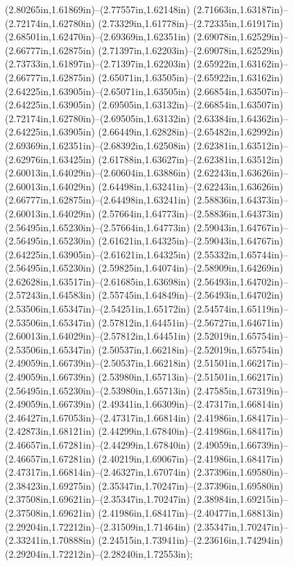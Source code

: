(2.80265in,1.61869in)--(2.77557in,1.62148in) (2.71663in,1.63187in)--(2.72174in,1.62780in) (2.73329in,1.61778in)--(2.72335in,1.61917in) (2.68501in,1.62470in)--(2.69369in,1.62351in) (2.69078in,1.62529in)--(2.66777in,1.62875in) (2.71397in,1.62203in)--(2.69078in,1.62529in) (2.73733in,1.61897in)--(2.71397in,1.62203in) (2.65922in,1.63162in)--(2.66777in,1.62875in) (2.65071in,1.63505in)--(2.65922in,1.63162in) (2.64225in,1.63905in)--(2.65071in,1.63505in) (2.66854in,1.63507in)--(2.64225in,1.63905in) (2.69505in,1.63132in)--(2.66854in,1.63507in) (2.72174in,1.62780in)--(2.69505in,1.63132in) (2.63384in,1.64362in)--(2.64225in,1.63905in) (2.66449in,1.62828in)--(2.65482in,1.62992in) (2.69369in,1.62351in)--(2.68392in,1.62508in) (2.62381in,1.63512in)--(2.62976in,1.63425in) (2.61788in,1.63627in)--(2.62381in,1.63512in) (2.60013in,1.64029in)--(2.60604in,1.63886in) (2.62243in,1.63626in)--(2.60013in,1.64029in) (2.64498in,1.63241in)--(2.62243in,1.63626in) (2.66777in,1.62875in)--(2.64498in,1.63241in) (2.58836in,1.64373in)--(2.60013in,1.64029in) (2.57664in,1.64773in)--(2.58836in,1.64373in) (2.56495in,1.65230in)--(2.57664in,1.64773in) (2.59043in,1.64767in)--(2.56495in,1.65230in) (2.61621in,1.64325in)--(2.59043in,1.64767in) (2.64225in,1.63905in)--(2.61621in,1.64325in) (2.55332in,1.65744in)--(2.56495in,1.65230in) (2.59825in,1.64074in)--(2.58909in,1.64269in) (2.62628in,1.63517in)--(2.61685in,1.63698in) (2.56493in,1.64702in)--(2.57243in,1.64583in) (2.55745in,1.64849in)--(2.56493in,1.64702in) (2.53506in,1.65347in)--(2.54251in,1.65172in) (2.54574in,1.65119in)--(2.53506in,1.65347in) (2.57812in,1.64451in)--(2.56727in,1.64671in) (2.60013in,1.64029in)--(2.57812in,1.64451in) (2.52019in,1.65754in)--(2.53506in,1.65347in) (2.50537in,1.66218in)--(2.52019in,1.65754in) (2.49059in,1.66739in)--(2.50537in,1.66218in) (2.51501in,1.66217in)--(2.49059in,1.66739in) (2.53980in,1.65713in)--(2.51501in,1.66217in) (2.56495in,1.65230in)--(2.53980in,1.65713in) (2.47585in,1.67319in)--(2.49059in,1.66739in) (2.49341in,1.66309in)--(2.47317in,1.66814in) (2.46427in,1.67053in)--(2.47317in,1.66814in) (2.41986in,1.68417in)--(2.42873in,1.68121in) (2.44299in,1.67840in)--(2.41986in,1.68417in) (2.46657in,1.67281in)--(2.44299in,1.67840in) (2.49059in,1.66739in)--(2.46657in,1.67281in) (2.40219in,1.69067in)--(2.41986in,1.68417in) (2.47317in,1.66814in)--(2.46327in,1.67074in) (2.37396in,1.69580in)--(2.38423in,1.69275in) (2.35347in,1.70247in)--(2.37396in,1.69580in) (2.37508in,1.69621in)--(2.35347in,1.70247in) (2.38984in,1.69215in)--(2.37508in,1.69621in) (2.41986in,1.68417in)--(2.40477in,1.68813in) (2.29204in,1.72212in)--(2.31509in,1.71464in) (2.35347in,1.70247in)--(2.33241in,1.70888in) (2.24515in,1.73941in)--(2.23616in,1.74294in) (2.29204in,1.72212in)--(2.28240in,1.72553in);

